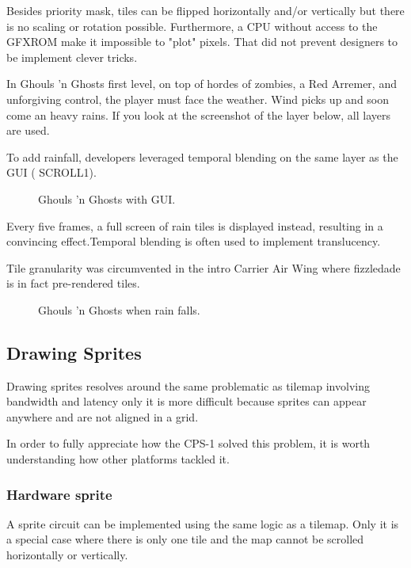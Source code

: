 Besides priority mask, tiles can be flipped horizontally and/or vertically but there is no scaling or rotation possible. Furthermore, a CPU without access to the GFXROM make it impossible to "plot" pixels. That did not prevent designers to be implement clever tricks.



In Ghouls 'n Ghosts first level, on top of hordes of zombies, a Red Arremer, and unforgiving control, the player must face the weather. Wind picks up and soon come an heavy rains. If you look at the screenshot of the layer below, all layers are used. 

To add rainfall, developers leveraged temporal blending on the same layer as the GUI ( SCROLL1). 

\vfill
\begin{figure}[!b]
 \caption*{Ghouls 'n Ghosts with GUI.}%
 \end{figure}%
\pagebreak

Every five frames, a full screen of rain tiles is displayed instead, resulting in a convincing effect.Temporal blending is often used to implement translucency. 

Tile granularity was circumvented in the intro Carrier Air Wing where fizzledade is in fact pre-rendered tiles.

 

\vfill
\begin{figure}[!b]
 \caption*{Ghouls 'n Ghosts when rain falls.}%
 \end{figure}%
\pagebreak




\subsection{Drawing Sprites}
Drawing sprites resolves around the same problematic as tilemap involving bandwidth and latency only it is more difficult because sprites can appear anywhere and are not aligned in a grid.

In order to fully appreciate how the CPS-1 solved this problem, it is worth understanding how other platforms tackled it.

\subsubsection{Hardware sprite}
A sprite circuit can be implemented using the same logic as a tilemap. Only it is a special case where there is only one tile and the map cannot be scrolled horizontally or vertically.

